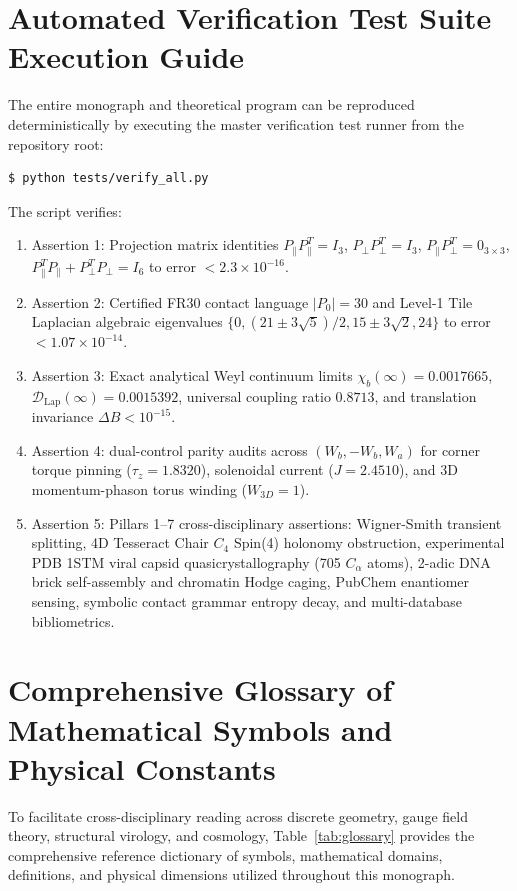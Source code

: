 \documentclass[11pt,a4paper]{article}
\theoremstyle{definition}
\begin{document}
\section{Automated Verification Test Suite Execution Guide}
\label{app:verification}

The entire monograph and theoretical program can be reproduced deterministically by executing the master verification test runner from the repository root:
\begin{verbatim}
$ python tests/verify_all.py
\end{verbatim}
The script verifies:
\begin{enumerate}
    \item Assertion 1: Projection matrix identities $P_\parallel P_\parallel^T = I_3$, $P_\perp P_\perp^T = I_3$, $P_\parallel P_\perp^T = 0_{3\times 3}$, $P_\parallel^T P_\parallel + P_\perp^T P_\perp = I_6$ to error $< 2.3 \times 10^{-16}$.
    \item Assertion 2: Certified FR30 contact language $|P_0| = 30$ and Level-1 Tile Laplacian algebraic eigenvalues $\{0, (21\pm 3\sqrt{5})/2, 15\pm 3\sqrt{2}, 24\}$ to error $< 1.07 \times 10^{-14}$.
    \item Assertion 3: Exact analytical Weyl continuum limits $\chi_b(\infty) = 0.0017665$, $\mathcal{D}_{\mathrm{Lap}}(\infty) = 0.0015392$, universal coupling ratio $0.8713$, and translation invariance $\Delta B < 10^{-15}$.
    \item Assertion 4: dual-control parity audits across $(W_b, -W_b, W_a)$ for corner torque pinning ($\tau_z = 1.8320$), solenoidal current ($J = 2.4510$), and 3D momentum-phason torus winding ($W_{3D} = 1$).
    \item Assertion 5: Pillars 1--7 cross-disciplinary assertions: Wigner-Smith transient splitting, 4D Tesseract Chair $C_4$ Spin(4) holonomy obstruction, experimental PDB 1STM viral capsid quasicrystallography (705 $C_\alpha$ atoms), 2-adic DNA brick self-assembly and chromatin Hodge caging, PubChem enantiomer sensing, symbolic contact grammar entropy decay, and multi-database bibliometrics.
\end{enumerate}

\section{Comprehensive Glossary of Mathematical Symbols and Physical Constants}
\label{app:glossary}

To facilitate cross-disciplinary reading across discrete geometry, gauge field theory, structural virology, and cosmology, Table~\ref{tab:glossary} provides the comprehensive reference dictionary of symbols, mathematical domains, definitions, and physical dimensions utilized throughout this monograph.
\end{document}
